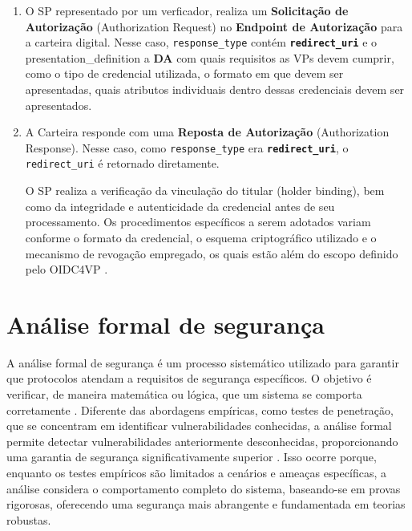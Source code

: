 \begin{enumerate}

    \item O \acs{SP} representado por um verficador, realiza um \textbf{Solicitação de Autorização} (Authorization Request) no \textbf{Endpoint de Autorização} para a carteira digital. Nesse caso, \texttt{response\_type} contém \textbf{\texttt{redirect\_uri}} e o presentation\_definition a \textbf{\acs{DA}} com quais requisitos as \acs{VP}s devem cumprir, como o tipo de credencial utilizada, o formato em que devem ser apresentadas, quais atributos individuais dentro dessas credenciais devem ser apresentados. 
    
    \item A Carteira responde com uma \textbf{Reposta de Autorização} (Authorization Response). Nesse caso, como \texttt{response\_type} era \textbf{\texttt{redirect\_uri}}, o \texttt{redirect\_uri} é retornado diretamente. 

    O \acs{SP} realiza a verificação da vinculação do titular (holder binding), bem como da integridade e autenticidade da credencial antes de seu processamento. Os procedimentos específicos a serem adotados variam conforme o formato da credencial, o esquema criptográfico utilizado e o mecanismo de revogação empregado, os quais estão além do escopo definido pelo \acs{OIDC4VP} \cite{OIDC4VCWhitepaper2022}.

\end{enumerate}

\newpage
\section{Análise formal de segurança}

A análise formal de segurança é um processo sistemático utilizado para garantir que protocolos atendam a requisitos de segurança específicos. O objetivo é verificar, de maneira matemática ou lógica, que um sistema se comporta corretamente \cite{Kulik2020}. Diferente das abordagens empíricas, como testes de penetração, que se concentram em identificar vulnerabilidades conhecidas, a análise formal permite detectar vulnerabilidades anteriormente desconhecidas, proporcionando uma garantia de segurança significativamente superior \cite{hauck2023openid}. Isso ocorre porque, enquanto os testes empíricos são limitados a cenários e ameaças específicas, a análise considera o comportamento completo do sistema, baseando-se em provas rigorosas, oferecendo uma segurança mais abrangente e fundamentada em teorias robustas.

